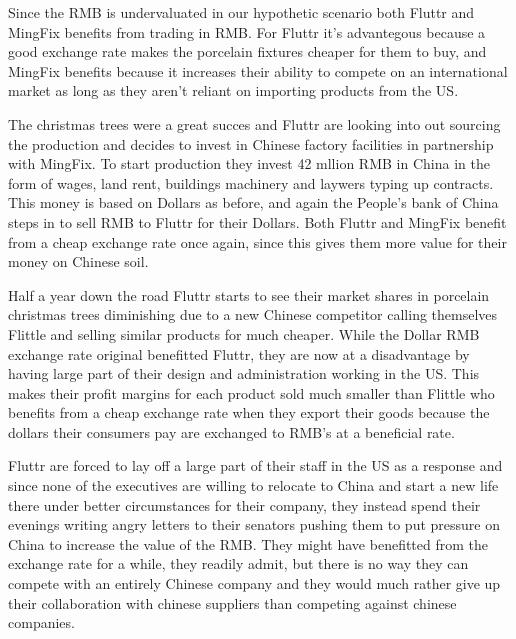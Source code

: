 \documentclass[11pt]{article}
\begin{document}
Since the RMB is undervaluated in our hypothetic scenario both Fluttr 
and MingFix benefits from trading in RMB. For Fluttr it's advantegous 
because a good exchange rate makes the porcelain fixtures cheaper for 
them to buy, and MingFix benefits because it increases their ability to 
compete on an international market as long as they aren't reliant on 
importing products from the US.


The christmas trees were a great succes and Fluttr are looking into out 
sourcing the production and decides to invest in Chinese factory 
facilities in partnership with MingFix. To start production they invest 
42 mllion RMB in China in the form of wages, land rent, buildings 
machinery and laywers typing up contracts.  This money is based on 
Dollars as before, and again the People's bank of China steps in to sell 
RMB to Fluttr for their Dollars.  Both Fluttr and MingFix benefit from a 
cheap exchange rate once again, since this gives them more value for 
their money on Chinese soil.

Half a year down the road Fluttr starts to see their market shares in 
porcelain christmas trees diminishing due to a new Chinese competitor 
calling themselves Flittle and selling similar products for much 
cheaper.  While the Dollar RMB exchange rate original benefitted Fluttr, 
they are now at a disadvantage by having large part of their design and 
administration working in the US. This makes their profit margins for 
each product sold much smaller than Flittle who benefits from a cheap 
exchange rate when they export their goods because the dollars their 
consumers pay are exchanged to RMB's at a beneficial rate.

Fluttr are forced to lay off a large part of their staff in the US as a 
response and since none of the executives are willing to relocate to 
China and start a new life there under better circumstances for their 
company, they instead spend their evenings writing angry letters to 
their senators pushing them to put pressure on China to increase the 
value of the RMB. They might have benefitted from the exchange rate for 
a while, they readily admit, but there is no way they can compete with 
an entirely Chinese company and they would much rather give up their 
collaboration with chinese suppliers than competing against chinese 
companies.
\end{document}
